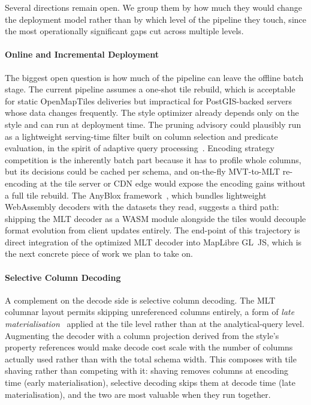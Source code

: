 Several directions remain open.
We group them by how much they would change the deployment model rather than by which level of the pipeline they touch, since the most operationally significant gaps cut across multiple levels.

\paragraph{Online and Incremental Deployment}
The biggest open question is how much of the pipeline can leave the offline batch stage.
The current pipeline assumes a one-shot tile rebuild, which is acceptable for static OpenMapTiles deliveries but impractical for PostGIS-backed servers whose data changes frequently.
The style optimizer already depends only on the style and can run at deployment time.
The pruning advisory could plausibly run as a lightweight serving-time filter built on column selection and predicate evaluation, in the spirit of adaptive query processing~\cite{deshpandeAdaptiveQueryProcessing2006}.
Encoding strategy competition is the inherently batch part because it has to profile whole columns, but its decisions could be cached per schema, and on-the-fly \ac{MVT}-to-\ac{MLT} re-encoding at the tile server or \ac{CDN} edge would expose the encoding gains without a full tile rebuild.
The AnyBlox framework~\cite{gienieczkoAnyBloxFrameworkSelfDecoding2025}, which bundles lightweight WebAssembly decoders with the datasets they read, suggests a third path: shipping the \ac{MLT} decoder as a \ac{WASM} module alongside the tiles would decouple format evolution from client updates entirely.
The end-point of this trajectory is direct integration of the optimized \ac{MLT} decoder into MapLibre GL~JS, which is the next concrete piece of work we plan to take on.

\paragraph{Selective Column Decoding}
A complement on the decode side is selective column decoding.
The \ac{MLT} columnar layout permits skipping unreferenced columns entirely, a form of \emph{late materialisation}~\cite{abadiMaterializationStrategiesColumnOriented2007} applied at the tile level rather than at the analytical-query level.
Augmenting the decoder with a column projection derived from the style's property references would make decode cost scale with the number of columns actually used rather than with the total schema width.
This composes with tile shaving rather than competing with it: shaving removes columns at encoding time (early materialisation), selective decoding skips them at decode time (late materialisation), and the two are most valuable when they run together.

